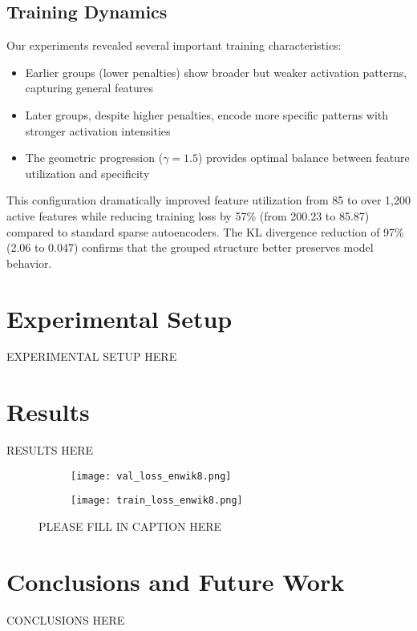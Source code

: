 \documentclass{article} %
\begin{document}
\subsection{Training Dynamics}
Our experiments revealed several important training characteristics:

\begin{itemize}
    \item Earlier groups (lower penalties) show broader but weaker activation patterns, capturing general features
    \item Later groups, despite higher penalties, encode more specific patterns with stronger activation intensities
    \item The geometric progression ($\gamma=1.5$) provides optimal balance between feature utilization and specificity
\end{itemize}

This configuration dramatically improved feature utilization from 85 to over 1,200 active features while reducing training loss by 57\% (from 200.23 to 85.87) compared to standard sparse autoencoders. The KL divergence reduction of 97\% (2.06 to 0.047) confirms that the grouped structure better preserves model behavior.

\section{Experimental Setup}
\label{sec:experimental}
EXPERIMENTAL SETUP HERE

\section{Results}
\label{sec:results}
RESULTS HERE

\begin{figure}[h]
    \centering
    \begin{subfigure}{0.49\textwidth}
        \texttt{[image: val\_loss\_enwik8.png]}
        \label{fig:first-run}
    \end{subfigure}
    \hfill
    \begin{subfigure}{0.49\textwidth}
        \texttt{[image: train\_loss\_enwik8.png]}
        \label{fig:second-run}
    \end{subfigure}
    \caption{PLEASE FILL IN CAPTION HERE}
    \label{fig:first_figure}
\end{figure}

\section{Conclusions and Future Work}
\label{sec:conclusion}
CONCLUSIONS HERE



\end{document}
